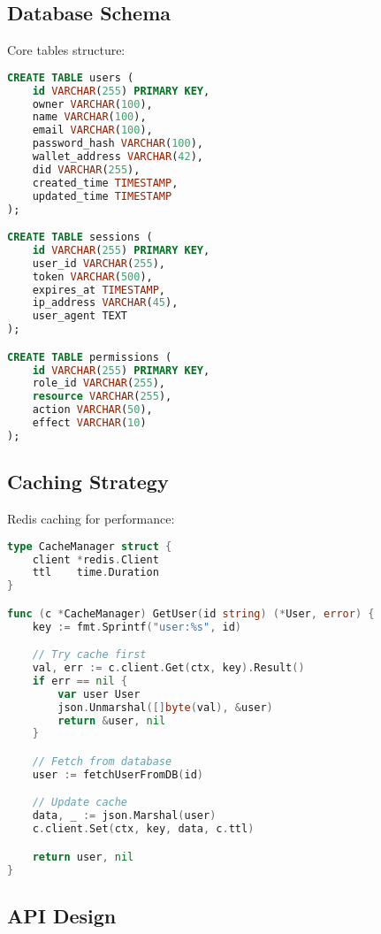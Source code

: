 \documentclass[11pt,a4paper]{article}
\begin{document}
\subsection{Database Schema}

Core tables structure:

\begin{lstlisting}[language=SQL]
CREATE TABLE users (
    id VARCHAR(255) PRIMARY KEY,
    owner VARCHAR(100),
    name VARCHAR(100),
    email VARCHAR(100),
    password_hash VARCHAR(100),
    wallet_address VARCHAR(42),
    did VARCHAR(255),
    created_time TIMESTAMP,
    updated_time TIMESTAMP
);

CREATE TABLE sessions (
    id VARCHAR(255) PRIMARY KEY,
    user_id VARCHAR(255),
    token VARCHAR(500),
    expires_at TIMESTAMP,
    ip_address VARCHAR(45),
    user_agent TEXT
);

CREATE TABLE permissions (
    id VARCHAR(255) PRIMARY KEY,
    role_id VARCHAR(255),
    resource VARCHAR(255),
    action VARCHAR(50),
    effect VARCHAR(10)
);
\end{lstlisting}

\subsection{Caching Strategy}

Redis caching for performance:

\begin{lstlisting}[language=Go]
type CacheManager struct {
    client *redis.Client
    ttl    time.Duration
}

func (c *CacheManager) GetUser(id string) (*User, error) {
    key := fmt.Sprintf("user:%s", id)

    // Try cache first
    val, err := c.client.Get(ctx, key).Result()
    if err == nil {
        var user User
        json.Unmarshal([]byte(val), &user)
        return &user, nil
    }

    // Fetch from database
    user := fetchUserFromDB(id)

    // Update cache
    data, _ := json.Marshal(user)
    c.client.Set(ctx, key, data, c.ttl)

    return user, nil
}
\end{lstlisting}

\subsection{API Design}
\end{document}
